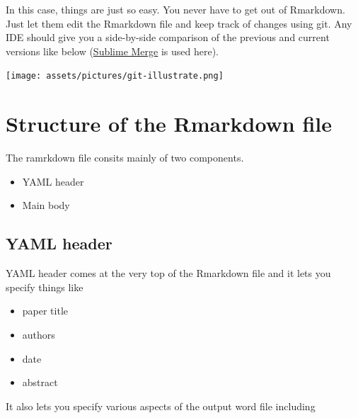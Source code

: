 \documentclass[
  letterpaper,
  DIV=11,
  numbers=noendperiod]{scrreprt}
\providecommand{\tightlist}{%
  \setlength{\itemsep}{0pt}\setlength{\parskip}{0pt}}\usepackage{longtable,booktabs,array}
\begin{document}
\begin{tcolorbox}[enhanced jigsaw, colframe=quarto-callout-note-color-frame, toptitle=1mm, colbacktitle=quarto-callout-note-color!10!white, toprule=.15mm, colback=white, arc=.35mm, bottomtitle=1mm, opacitybacktitle=0.6, breakable, left=2mm, coltitle=black, leftrule=.75mm, title={Case 2: every single one of the authors knows how to use Rmarkdown and
git}, rightrule=.15mm, titlerule=0mm, opacityback=0, bottomrule=.15mm]

In this case, things are just so easy. You never have to get out of
Rmarkdown. Just let them edit the Rmarkdown file and keep track of
changes using git. Any IDE should give you a side-by-side comparison of
the previous and current versions like below
(\href{https://www.sublimemerge.com/}{Sublime Merge} is used here).

\texttt{[image: assets/pictures/git-illustrate.png]}

\end{tcolorbox}

\hypertarget{structure-of-the-rmarkdown-file}{%
\section{Structure of the Rmarkdown
file}\label{structure-of-the-rmarkdown-file}}

The ramrkdown file consits mainly of two components.

\begin{itemize}
\tightlist
\item
  YAML header
\item
  Main body
\end{itemize}

\hypertarget{yaml-header}{%
\subsection{YAML header}\label{yaml-header}}

YAML header comes at the very top of the Rmarkdown file and it lets you
specify things like

\begin{itemize}
\tightlist
\item
  paper title
\item
  authors
\item
  date
\item
  abstract
\end{itemize}

It also lets you specify various aspects of the output word file
including
\end{document}
